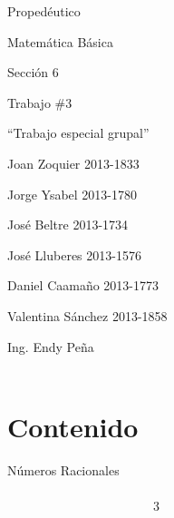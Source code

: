 \documentclass{article}
\title{}
\begin{document}
\clearpage\setcounter{page}{1}
\bigskip


\bigskip


\bigskip


\bigskip


\bigskip


\bigskip


\bigskip


\bigskip

Proped\'eutico\\


\bigskip

Matem\'atica B\'asica\\


\bigskip

Secci\'on 6\\


\bigskip

Trabajo \#3\\


\bigskip

{\textquotedblleft}Trabajo especial grupal{\textquotedblright}\\


\bigskip

Joan Zoquier 2013-1833\


\bigskip

Jorge Ysabel 2013-1780\


\bigskip

Jos\'e Beltre 2013-1734\


\bigskip

Jos\'e Lluberes 2013-1576\


\bigskip

Daniel Caama\~no 2013-1773\


\bigskip

Valentina S\'anchez 2013-1858\\


\bigskip


\bigskip

Ing. Endy Pe\~na\\\

\bigskip

\clearpage\section[Contenido]{Contenido}


\bigskip


\bigskip

N\'umeros Racionales \ \ \ \ \ \ \ \ \ \ \ \ \ \ \ \ \ \ \ \ \ \ \ \ \ \ \ \ \ \ \ \ \ \ \ \ \ \ \ \ \ \ \ \ \ \ \ \ \ \ \ \ \ \ \ \ \ \ \ \ \ \ \ \ \ \ \ \ \ \ \ \ \ \ \ \ \ \ \ \ \ \ \ \ \ \ \ \ \ \ \ \ \ \ \ 3
\end{document}
